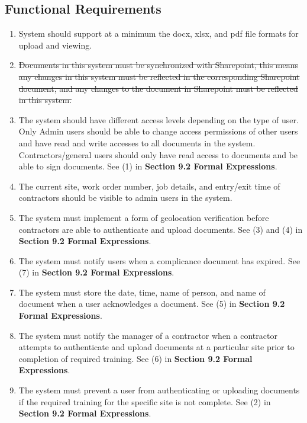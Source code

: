 \documentclass[12pt]{article}
\begin{document}
\subsection{Functional Requirements}
\begin{enumerate} [{FR}1.]
  \item System should support at a minimum the docx, xlsx, and pdf
    file formats for upload and viewing.
  \item \sout{Documents in this system must be synchronized with
      Sharepoint, this means any changes in this system must be
      reflected in the corresponding Sharepoint document, and any
    changes to the document in Sharepoint must be reflected in this system.}
  \item The system should have different access levels depending on
    the type of user. Only Admin users should be able to change
    access permissions of other users and have read and write
    accesses to all documents in the system. Contractors/general
    users should only have read access to documents and be able to
    sign documents. See (1) in \textbf{Section 9.2 Formal Expressions}.
  \item The current site, work order number, job details, and entry/exit time of
    contractors should be visible to admin users in the system.
  \item The system must implement a form of geolocation verification before
    contractors are able to authenticate and upload documents. See (3) and
    (4) in \textbf{Section 9.2 Formal Expressions}.
  \item The system must notify users when a complicance document has expired.
    See (7) in \textbf{Section 9.2 Formal Expressions}.
  \item The system must store the date, time, name of person, and name of
    document when a user acknowledges a document. See (5) in
    \textbf{Section 9.2 Formal Expressions}.
  \item The system must notify the manager of a contractor when a contractor
    attempts to authenticate and upload documents at a particular site prior to
    completion of required training. See (6) in
    \textbf{Section 9.2 Formal Expressions}.
  \item The system must prevent a user from authenticating or uploading
    documents if the required training for the specific site is not complete.
    See (2) in \textbf{Section 9.2 Formal Expressions}.

\end{enumerate}
\end{document}
